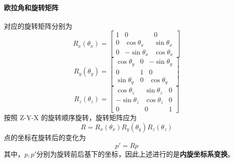 \paragraph{欧拉角和旋转矩阵}
对应的旋转矩阵分别为
\begin{equation}
  R_x(\theta_x)=
  \begin{bmatrix}
    1 & 0              & 0             \\
    0 & \cos \theta_x  & \sin \theta_x \\
    0 & -\sin \theta_x & \cos \theta_x
  \end{bmatrix}
\end{equation}
\begin{equation}
  R_y(\theta_y)=
  \begin{bmatrix}
    \cos \theta_y & 0 & -\sin \theta_y \\
    0             & 1 & 0              \\
    \sin \theta_y & 0 & \cos \theta_y
  \end{bmatrix}
\end{equation}
\begin{equation}
  R_z(\theta_z)=
  \begin{bmatrix}
    \cos \theta_z  & \sin \theta_z & 0 \\
    -\sin \theta_z & \cos \theta_z & 0 \\
    0              & 0             & 1
  \end{bmatrix}
\end{equation}
按照 Z-Y-X 的旋转顺序旋转，旋转矩阵应为
\begin{equation}
  R=R_x(\theta_x) R_y(\theta_y) R_z(\theta_z)
\end{equation}
点的坐标在旋转后的变化为
\begin{equation}
  p' = R p
\end{equation}
其中，$p,p'$分别为旋转前后基下的坐标，因此上述进行的是\textbf{内旋坐标系变换}。

